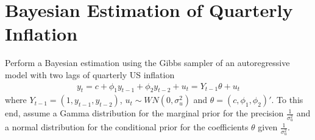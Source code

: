 \section[Bayesian Estimation of Quarterly Inflation]{Bayesian Estimation of Quarterly Inflation\label{ex:BayesianEstimationQuarterlyInflation}}
Perform a Bayesian estimation using the Gibbs sampler of an autoregressive model with two lags of quarterly US inflation
\begin{align*}
y_t = c + \phi_1 y_{t-1} + \phi_2 y_{t-2} + u_t = Y_{t-1} \theta + u_t
\end{align*}
where \(Y_{t-1}=(1,y_{t-1},y_{t-2})\), \(u_t\sim WN(0,\sigma_u^2)\) and \(\theta = (c,\phi_1,\phi_2)'\).
To this end, assume a Gamma distribution for the marginal prior for the precision \(\frac{1}{\sigma_u^2}\)
  and a normal distribution for the conditional prior for the coefficients \(\theta \) given \(\frac{1}{\sigma_u^2}\).

